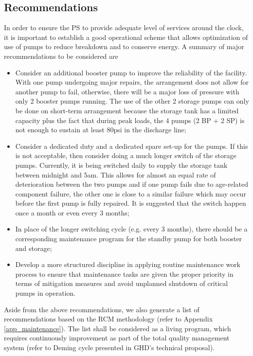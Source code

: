 \subsection{Recommendations}
In order to ensure the PS to provide adequate level of services around the clock, it is important to establish a good operational scheme that allows optimization of use of pumps to reduce breakdown and to conserve energy. A summary of major recommendations to be considered are

\begin{itemize}

\item Consider an additional booster pump to improve the reliability of the facility. With one pump undergoing major repairs, the arrangement does not allow for another pump to fail, otherwise, there will be a major loss of pressure with only 2 booster pumps running. The use of the other 2 storage pumps can only be done on short-term arrangement because the storage tank has a limited capacity plus the fact that during peak loads, the 4 pumps (2 BP + 2 SP) is not enough to sustain at least 80psi in the discharge line; 

\item Consider a dedicated duty and a dedicated spare set-up for the pumps. If this is not acceptable, then consider doing a much longer switch of the storage pumps. Currently, it is being switched daily to supply the storage tank between midnight and 5am. This allows for almost an equal rate of deterioration between the two pumps and if one pump fails due to age-related component failure, the other one is close to a similar failure which may occur before the first pump is fully repaired. It is suggested that the switch happen once a month or even every 3 months; 

\item In place of the longer switching cycle (e.g. every 3 months), there should be a corresponding maintenance program for the standby pump for both booster and storage; 

\item Develop a more structured discipline in applying routine maintenance work process to ensure that maintenance tasks are given the proper priority in terms of mitigation measures and avoid unplanned shutdown of critical pumps in operation. 

\end{itemize}

Aside from the above recommendations, we also generate a list of recommendations based on the RCM methodology (refer to Appendix \ref{app_maintenance}). The list shall be considered as a living program, which requires continuously improvement as part of the total quality management system (refer to Deming cycle presented in GHD's technical proposal).

%